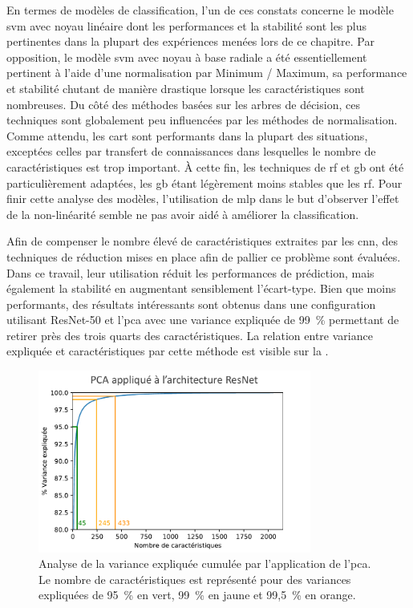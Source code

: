 En termes de modèles de classification, l'un de ces constats concerne le modèle \gls{svm} avec noyau linéaire dont les performances et la stabilité sont les plus pertinentes dans la plupart des expériences menées lors de ce chapitre. Par opposition, le modèle \gls{svm} avec noyau à base radiale a été essentiellement pertinent à l'aide d'une normalisation par Minimum / Maximum, sa performance et stabilité chutant de manière drastique lorsque les caractéristiques sont nombreuses. Du côté des méthodes basées sur les arbres de décision, ces techniques sont globalement peu influencées par les méthodes de normalisation. Comme attendu, les \gls{cart} sont performants dans la plupart des situations, exceptées celles par transfert de connaissances dans lesquelles le nombre de caractéristiques est trop important. À cette fin, les techniques de \gls{rf} et \gls{gb} ont été particulièrement adaptées, les \gls{gb} étant légèrement moins stables que les \gls{rf}. Pour finir cette analyse des modèles, l'utilisation de \gls{mlp} dans le but d'observer l'effet de la non-linéarité semble ne pas avoir aidé à améliorer la classification.\par

Afin de compenser le nombre élevé de caractéristiques extraites par les \gls{cnn}, des techniques de réduction mises en place afin de pallier ce problème sont évaluées. Dans ce travail, leur utilisation réduit les performances de prédiction, mais également la stabilité en augmentant sensiblement l'écart-type. Bien que moins performants, des résultats intéressants sont obtenus dans une configuration utilisant ResNet-50 et l'\gls{pca} avec une variance expliquée de 99~\% permettant de retirer près des trois quarts des caractéristiques. La relation entre variance expliquée et caractéristiques par cette méthode est visible sur la .\par

\begin{figure}[H]
    \centering
    \includegraphics[width=0.8\textwidth]{contents/chapter_5/resources/results_image_classification_pca_variance.pdf}
    \caption{Analyse de la variance expliquée cumulée par l'application de l'\gls{pca}. Le nombre de caractéristiques est représenté pour des variances expliquées de 95~\% en vert, 99~\% en jaune et 99,5~\% en orange.}
    \label{fig:results_image_classification_pca_variance}
\end{figure}\par

